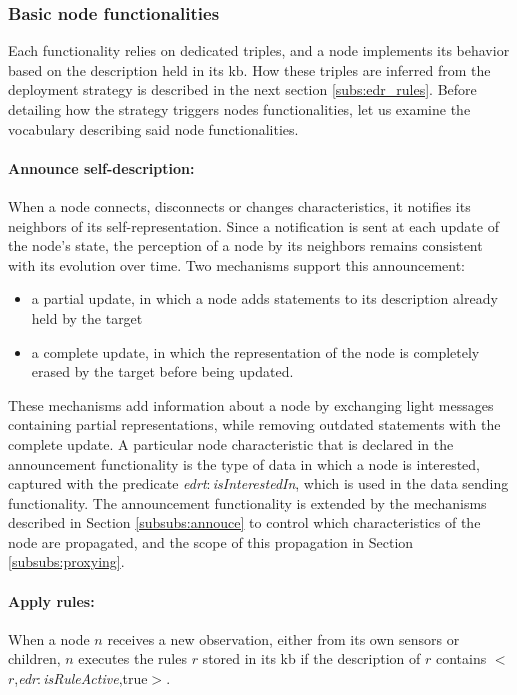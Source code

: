 \documentclass{iosart2c}
\newcommand{\namespace}[1]{\textit{#1$:$}}
\newcommand{\concept}[2]{\namespace{#1}\-\textit{#2}}
\newcommand{\triplet}[3]{$<$#1,\textit{#2},#3$>$}
\begin{document}
\subsubsection{Basic node functionalities}
\label{subsubs:basic_functionalities}

Each functionality relies on dedicated triples, and a node implements its behavior based on the description held in its \gls{kb}.
How these triples are inferred from the deployment strategy is described in the next section \textsection \ref{subs:edr_rules}.
Before detailing how the strategy triggers nodes functionalities, let us examine the vocabulary describing said node functionalities.

\paragraph{Announce self-description:}
When a node connects, disconnects or changes characteristics, it notifies its neighbors of its self-representation.
Since a notification is sent at each update of the node's state, the perception of a node by its neighbors remains consistent with its evolution over time.
Two mechanisms support this announcement: 
\begin{itemize}
	\item a partial update, in which a node adds statements to its description already held by the target
	\item a complete update, in which the representation of the node is completely erased by the target before being updated.
\end{itemize}
These mechanisms add information about a node by exchanging light messages containing partial representations, while removing outdated statements with the complete update. 
A particular node characteristic that is declared in the announcement functionality is the type of data in which a node is interested, captured with the predicate \concept{edrt}{is\-Interested\-In}, which is used in the data sending functionality.
The announcement functionality is extended by the mechanisms described in Section \textsection \ref{subsubs:annouce} to control which characteristics of the node are propagated, and the scope of this propagation in Section \textsection \ref{subsubs:proxying}.

\paragraph{Apply rules:}
When a node $n$ receives a new observation, either from its own sensors or children, $n$ executes the rules $r$ stored in its \gls{kb} if the description of $r$ contains \triplet{$r$}{\concept{edr}{is\-Rule\-Active}}{true}.
\end{document}
